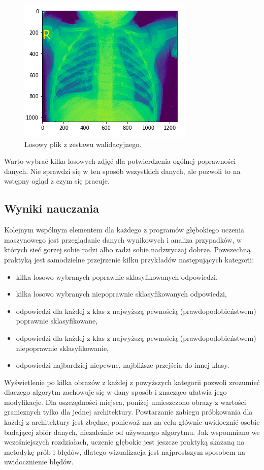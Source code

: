 \documentclass[12pt,a4paper,twoside,titlepage,openright]{book}
\begin{document}
\begin{itemize}
\begin{itemize}
\begin{figure}[ht]
	\centering
			\includegraphics[resolution=100, scale=0.7]{ExampleLungImage.png}
		\caption{Losowy plik z zestawu walidacyjnego.}
\end{figure}

Warto wybrać kilka losowych zdjęć dla potwierdzenia ogólnej poprawności danych. Nie sprawdzi się w ten sposób wszystkich danych, ale pozwoli to na wstępny ogląd z czym się pracuje.

\subsection{Wyniki nauczania}
Kolejnym wspólnym elementem dla każdego z programów głębokiego uczenia maszynowego jest przeglądanie danych wynikowych i analiza przypadków, w których sieć gorzej sobie radzi albo radzi sobie nadzwyczaj dobrze. Powszechną praktyką jest samodzielne przejrzenie kilku przykładów następujących kategorii:
\begin{itemize}
\item kilka losowo wybranych poprawnie sklasyfikowanych odpowiedzi,
\item kilka losowo wybranych niepoprawnie sklasyfikowanych odpowiedzi,
\item odpowiedzi dla każdej z klas z najwyższą pewnością (prawdopodobieństwem) poprawnie sklasyfikowane,
\item odpowiedzi dla każdej z klas z najwyższą pewnością (prawdopodobieństwem) niepoprawnie sklasyfikowanie,
\item odpowiedzi najbardziej niepewne, najbliższe przejścia do innej klasy.
\end{itemize}
Wyświetlenie po kilka obrazów z każdej z powyższych kategorii pozwoli zrozumieć dlaczego algorytm zachowuje się w dany sposób i znacząco ułatwia jego modyfikacje. Dla oszczędności miejsca, poniżej umieszczono obrazy z wartości granicznych tylko dla jednej architektury. Powtarzanie zabiegu próbkowania dla każdej z architektury jest zbędne, ponieważ ma na celu głównie uwidocznić osobie badającej zbiór danych, niezależnie od używanego algorytmu. Jak wspomniano we wcześniejszych rozdziałach, uczenie głębokie jest jeszcze praktyką skazaną na metodykę prób i błędów, dlatego wizualizacja jest najprostszym sposobem na uwidocznienie błędów.


\end{itemize}
\end{itemize}
\end{document}
